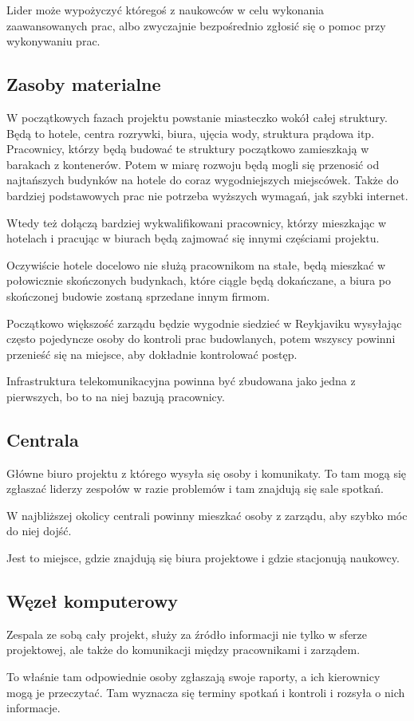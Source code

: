 Lider może wypożyczyć któregoś z naukowców w celu wykonania zaawansowanych prac, albo zwyczajnie bezpośrednio zgłosić się o pomoc przy wykonywaniu prac.

\subsection{Zasoby materialne}
W początkowych fazach projektu powstanie miasteczko wokół całej struktury. Będą to hotele, centra rozrywki, biura, ujęcia wody, struktura prądowa itp.
Pracownicy, którzy będą budować te struktury początkowo zamieszkają w barakach z kontenerów. Potem w miarę rozwoju będą mogli się przenosić od najtańszych budynków na hotele do coraz wygodniejszych miejscówek.
Także do bardziej podstawowych prac nie potrzeba wyższych wymagań, jak szybki internet.

Wtedy też dołączą bardziej wykwalifikowani pracownicy, którzy mieszkając w hotelach i pracując w biurach będą zajmować się innymi częściami projektu.

Oczywiście hotele docelowo nie służą pracownikom na stałe, będą mieszkać w połowicznie skończonych budynkach, które ciągle będą dokańczane, a biura po skończonej budowie zostaną sprzedane innym firmom.

Początkowo większość zarządu będzie wygodnie siedzieć w Reykjaviku wysyłając często pojedyncze osoby do kontroli prac budowlanych, potem wszyscy powinni przenieść się na miejsce, aby dokładnie kontrolować postęp.

Infrastruktura telekomunikacyjna powinna być zbudowana jako jedna z pierwszych, bo to na niej bazują pracownicy.

\subsection{Centrala}
Główne biuro projektu z którego wysyła się osoby i komunikaty.
To tam mogą się zgłaszać liderzy zespołów w razie problemów i tam znajdują się sale spotkań.

W najbliższej okolicy centrali powinny mieszkać osoby z zarządu, aby szybko móc do niej dojść.

Jest to miejsce, gdzie znajdują się biura projektowe i gdzie stacjonują naukowcy.

\subsection{Węzeł komputerowy}
Zespala ze sobą cały projekt, służy za źródło informacji nie tylko w sferze projektowej, ale także do komunikacji między pracownikami i zarządem.

To właśnie tam odpowiednie osoby zgłaszają swoje raporty, a ich kierownicy mogą je przeczytać.
Tam wyznacza się terminy spotkań i kontroli i rozsyła o nich informacje.